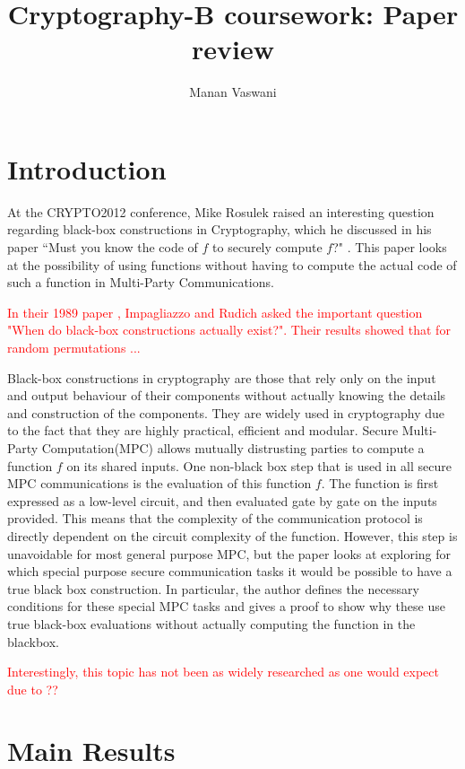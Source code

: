 \documentclass[11pt]{article}
\theoremstyle{theorem}
\theoremstyle{theorem}
\theoremstyle{remark}
\theoremstyle{note}
\theoremstyle{plain}
\theoremstyle{definition}
\begin{document}
\title{Cryptography-B coursework: Paper review}
\author{Manan Vaswani}

\maketitle

\section{Introduction}
At the CRYPTO2012 conference, Mike Rosulek raised an interesting question regarding black-box constructions in Cryptography, which he discussed in his paper ``Must you know the code of $f$ to securely compute $f$?"  \cite{C:Rosulek12a}. This paper looks at the possibility of using functions without having to compute the actual code of such a function in Multi-Party Communications.

\textcolor{red}{In their 1989 paper \cite{STOC:ImpRud89}, Impagliazzo and Rudich asked the important question "When do black-box constructions actually exist?". Their results showed that for random permutations ...}

Black-box constructions in cryptography are those that rely only on the input and output behaviour of their components without actually knowing the details and construction of the components. They are widely used in cryptography due to the fact that they are highly practical, efficient and modular. Secure Multi-Party Computation(MPC) allows mutually distrusting parties to compute a function $f$ on its shared inputs. One non-black box step that is used in all secure MPC communications is the evaluation of this function $f$. The function is first expressed as a low-level circuit, and then evaluated gate by gate on the inputs provided. This means that the complexity of the communication protocol is directly dependent on the circuit complexity of the function. However, this step is unavoidable for most general purpose MPC, but the paper looks at exploring for which special purpose secure communication tasks it would be possible to have a true black box construction.  In particular, the author defines the necessary conditions for these special MPC tasks and gives a proof to show why these use true black-box evaluations without actually computing the function in the blackbox.

\textcolor{red}{Interestingly, this topic has not been as widely researched as one would expect due to ??}

\section{Main Results}
\end{document}
